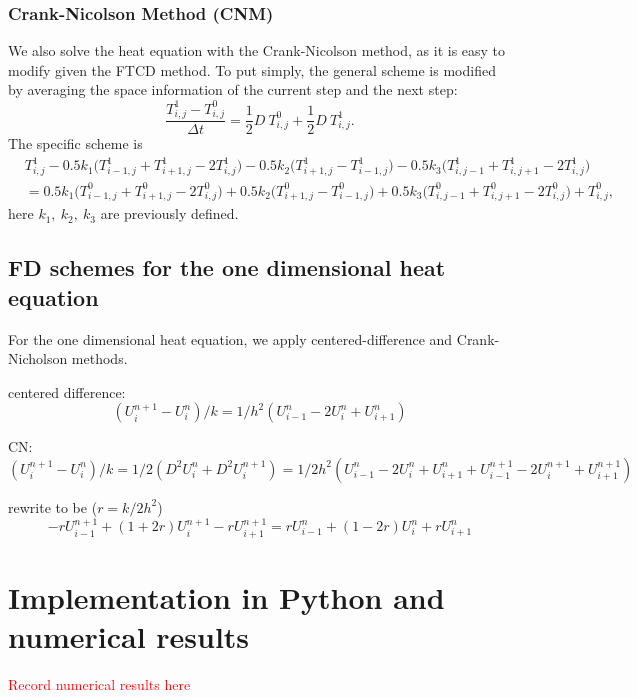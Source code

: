 \documentclass[12pt]{article}
\begin{document}
\subsubsection{Crank-Nicolson Method (CNM)}
We also solve the heat equation with the Crank-Nicolson method, as it is easy to modify given the FTCD method. To put simply, the general scheme is modified by averaging the space information of the current step and the next step:
\begin{equation}
\frac{T^1_{i,j}-T^0_{i,j}}{\Delta t}=\frac{1}{2}D\ T^0_{i,j}+\frac{1}{2}D\ T^1_{i,j}.
\end{equation}
The specific scheme is 
\begin{align}
& T^1_{i,j}-0.5k_1\bigg(T^1_{i-1,j}+T^1_{i+1,j}-2T^1_{i,j}\bigg)-0.5k_2\bigg(T^1_{i+1,j}-T^1_{i-1,j}\bigg)
-0.5k_3\bigg(T^1_{i,j-1}+T^1_{i,j+1}-2T^1_{i,j}\bigg)\nonumber\\
&= 0.5k_1\bigg(T^0_{i-1,j}+T^0_{i+1,j}-2T^0_{i,j}\bigg)+0.5k_2\bigg(T^0_{i+1,j}-T^0_{i-1,j}\bigg)
+0.5k_3\bigg(T^0_{i,j-1}+T^0_{i,j+1}-2T^0_{i,j}\bigg)+T^0_{i,j},
\end{align}
here $k_1,\ k_2,\ k_3$ are previously defined. 

\subsection{FD schemes for the one dimensional heat equation}

For the one dimensional heat equation, we apply centered-difference and Crank-Nicholson methods. 

centered difference:
$$(U^{n+1}_i - U^n_i)/k = 1/h^2 (U^n_{i-1} - 2U^n_i + U^n_{i+1})$$

CN:
$$(U^{n+1}_i - U^n_i)/k = 1/2 (D^2U^n_i + D^2U^{n+1}_i) 
=1/2h^2(U^n_{i-1} - 2U^n_i + U^n_{i+1} + U^{n+1}_{i-1} - 2U^{n+1}_i + U^{n+1}_{i+1})$$   

rewrite to be ($r=k/2h^2$)
$$-r U^{n+1}_{i-1} + (1+2r) U^{n+1}_i - r U^{n+1}_{i+1} = 
r U^n_{i-1} + (1-2r) U^n_i + r U^n_{i+1}$$

\section{Implementation in Python and numerical results}
\textcolor{red}{Record numerical results here}
\end{document}
